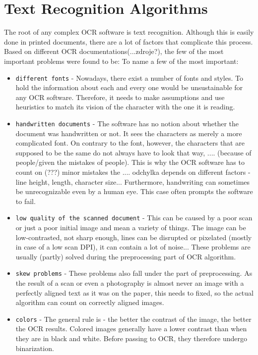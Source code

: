 \chapter{Text Recognition Algorithms}

The root of any complex OCR software is text recognition.
Although this is easily done in printed documents, there are a lot of factors that complicate this process.
Based on different OCR documentations(...zdroje?), the few of the most important problems were found to be:
To name a few of the most important:
\begin{itemize}
\item\texttt{different fonts} - Nowadays, there exist a number of fonts and styles. To hold the information about each and every one would be unsustainable for any OCR software. Therefore, it needs to make assumptions and use heuristics to match its vision of the character with the one it is reading.
\item\texttt {handwritten documents} - The software has no notion about whether the document was handwritten or not. It sees the characters as merely a more complicated font. On contrary to the font, however, the characters that are supposed to be the same do not always have to look that way, .... (because of people/given the mistakes of people).  This is why the OCR software has to count on (???) minor mistakes the .... odchylka depends on different factors - line height, length, character size... Furthermore, handwriting can sometimes be unrecognizable even by a human eye. This case often prompts the software to fail.
\item\texttt {low quality of the scanned document} - This can be caused by a poor scan or just a poor initial image and mean a variety of things. The image can be low-contrasted, not sharp enough, lines can be disrupted or pixelated (mostly in case of a low scan DPI), it can contain a lot of noise... These problems are usually (partly) solved during the preprocessing part of OCR algorithm.
\item\texttt {skew problems} - These problems also fall under the part of preprocessing. As the result of a scan or even a photography is almost never an image with a perfectly aligned text as it was on the paper, this needs to fixed, so the actual algorithm can count on correctly aligned images.
\item\texttt {colors} - The general rule is - the better the contrast of the image, the better the OCR results. Colored images generally have a lower contrast than when they are in black and white. Before passing to OCR, they therefore undergo binarization.

\end{itemize}
